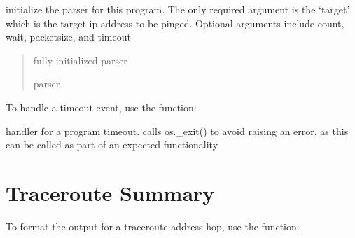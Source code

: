 \documentclass[letterpaper,10pt,english,openany,oneside]{sphinxmanual}
\begin{document}
\begin{fulllineitems}
\label{\detokenize{index:my_ping.initialize_parser}}
\pysigstartsignatures
\pysiglinewithargsret
{}
{}
{}
\pysigstopsignatures
\sphinxAtStartPar
initialize the parser for this program. The only required argument is the ‘target’ which is the target ip address
to be pinged. Optional arguments include count, wait, packetsize, and timeout
\begin{quote}\begin{description}
\sphinxAtStartPar
fully initialized parser

\sphinxAtStartPar
parser

\end{description}\end{quote}

\end{fulllineitems}


\sphinxAtStartPar
To handle a timeout event, use the  function:

\begin{fulllineitems}
\label{\detokenize{index:my_ping.timeout_handler}}
\pysigstartsignatures
\pysiglinewithargsret
{}
{\sphinxparamcomma {}}
{}
\pysigstopsignatures
\sphinxAtStartPar
handler for a program timeout. calls os.\_exit() to avoid raising an error, as this
can be called as part of an expected functionality

\end{fulllineitems}



\chapter{Traceroute Summary}
\label{\detokenize{index:traceroute-summary}}
\sphinxAtStartPar
To format the output for a traceroute address hop, use the  function:
\end{document}
